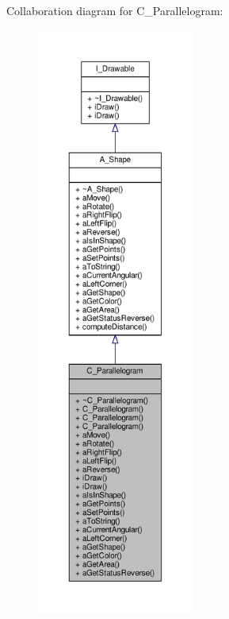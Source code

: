 Collaboration diagram for C\+\_\+\+Parallelogram\+:
\nopagebreak
\begin{figure}[H]
\begin{center}
\leavevmode
\includegraphics[height=550pt]{classC__Parallelogram__coll__graph}
\end{center}
\end{figure}
